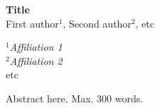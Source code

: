 \documentclass{article}
\begin{document}
\begin{center}
 {\large \bf Title}\\
First author$^1$, Second author$^2$, etc
\end{center}

\begin{center}
 {\it $^1$Affiliation 1}\\
{\it $^2$Affiliation 2}\\
etc
\end{center}

Abstract here. Max. 300 words.
\end{document}
